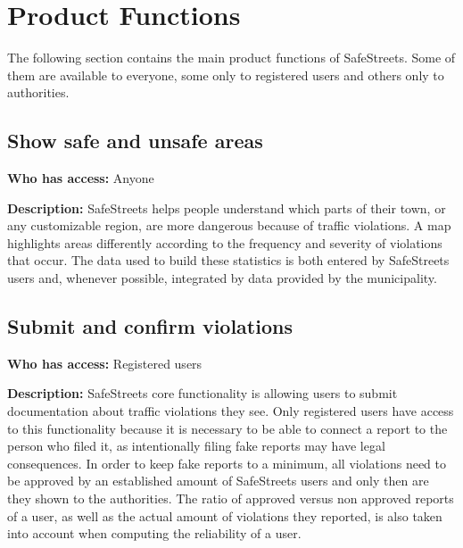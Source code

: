 \section{Product Functions}
The following section contains the main product functions of SafeStreets. Some of them are available to everyone, some only to registered users and others only to authorities.

  \subsection{Show safe and unsafe areas}
  \begin{description}
    \item \textbf{Who has access:} \newline Anyone
    \item \textbf{Description:} \newline SafeStreets helps people understand which parts of their town, or any customizable region, are more dangerous because of traffic violations. A map highlights areas differently according to the frequency and severity of violations that occur. The data used to build these statistics is both entered by SafeStreets users and, whenever possible, integrated by data provided by the municipality.
  \end{description}

  \subsection{Submit and confirm violations}
  \begin{description}
    \item \textbf{Who has access:} \newline Registered users
    \item \textbf{Description:} \newline SafeStreets core functionality is allowing users to submit documentation about traffic violations they see. Only registered users have access to this functionality because it is necessary to be able to connect a report to the person who filed it, as intentionally filing fake reports may have legal consequences. In order to keep fake reports to a minimum, all violations need to be approved by an established amount of SafeStreets users and only then are they shown to the authorities. The ratio of approved versus non approved reports of a user, as well as the actual amount of violations they reported, is also taken into account when computing the reliability of a user.
  \end{description}

